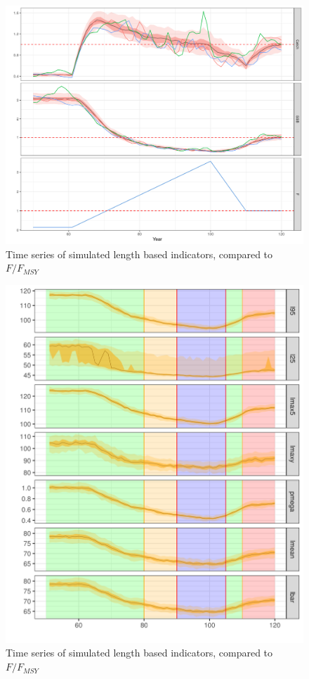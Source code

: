 \begin{figure}[h]\centering
\includegraphics[width=\textwidth]{figs/roc-finalts-pollack-1.png}
\caption{Time series of simulated length based indicators, compared to $F/F_{MSY}$}
\label{fig:ompollack}
\end{figure}

\begin{figure}[h]\centering
\includegraphics[width=\textwidth]{figs/roc-finalinds-1.png}
\caption{Time series of simulated length based indicators, compared to $F/F_{MSY}$}
\label{fig:libsim}
\end{figure}

